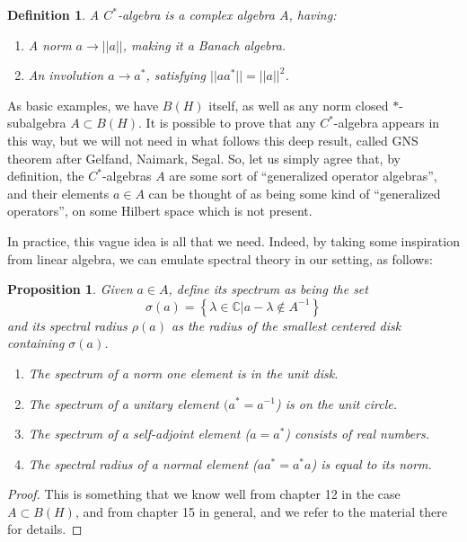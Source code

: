 \documentclass[12pt]{amsbook}
\newtheorem{definition}[theorem]{Definition}
\newtheorem{proposition}[theorem]{Proposition}
\begin{document}
\begin{definition}
A $C^*$-algebra is a complex algebra $A$, having:
\begin{enumerate}
\item A norm $a\to||a||$, making it a Banach algebra.

\item An involution $a\to a^*$, satisfying $||aa^*||=||a||^2$.
\end{enumerate}
\end{definition}

As basic examples, we have $B(H)$ itself, as well as any norm closed $*$-subalgebra $A\subset B(H)$. It is possible to prove that any $C^*$-algebra appears in this way, but we will not need in what follows this deep result, called GNS theorem after Gelfand, Naimark, Segal. So, let us simply agree that, by definition, the $C^*$-algebras $A$ are some sort of ``generalized operator algebras'', and their elements $a\in A$ can be thought of as being some kind of ``generalized operators'', on some Hilbert space which is not present.

\bigskip

In practice, this vague idea is all that we need. Indeed, by taking some inspiration from linear algebra, we can emulate spectral theory in our setting, as follows:

\begin{proposition}
Given $a\in A$, define its spectrum as being the set
$$\sigma(a)=\left\{\lambda\in\mathbb C\Big|a-\lambda\not\in A^{-1}\right\}$$
and its spectral radius $\rho(a)$ as the radius of the smallest centered disk containing $\sigma(a)$.
\begin{enumerate}
\item The spectrum of a norm one element is in the unit disk.

\item The spectrum of a unitary element $(a^*=a^{-1}$) is on the unit circle. 

\item The spectrum of a self-adjoint element ($a=a^*$) consists of real numbers. 

\item The spectral radius of a normal element ($aa^*=a^*a$) is equal to its norm.
\end{enumerate}
\end{proposition}

\begin{proof}
This is something that we know well from chapter 12 in the case $A\subset B(H)$, and from chapter 15 in general, and we refer to the material there for details.
\end{proof}
\end{document}
